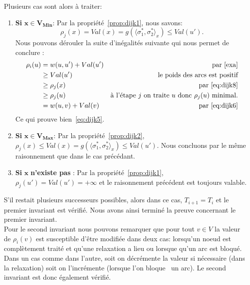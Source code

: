 \begin{enumerate}
Plusieurs cas sont alors à traiter:

\begin{enumerate}
	\item \textbf{Si }$\mathbf{x \in V_{Min}}$: Par la propriété~\ref{prop:dijk1}, nous savons:
	 \begin{equation}
		\label{eq:dijk8}\rho_j(x) = Val(x) = g(\langle \sigma_1^*, \sigma_2^* \rangle_x) \leq Val(u') .
	\end{equation}
	Nous pouvons dérouler la suite d'inégalités suivante qui nous permet de conclure : 
	\begin{align*}
		\rho_i(u) &= w(u,u') + Val(u') & \text{par}~\eqref{exa}\\
		 		  &\geq Val(u') & \text{le poids des arcs est positif} \\
				  &\geq \rho_j(x) & \text{par}~\eqref{eq:dijk8} \\
				  &\geq \rho_j(u) &  \text{à l'étape }j \text{ on traite }u \text{ donc }\rho_j(u) \text{ minimal.}\\
				  &= w(u,v) + Val(v) & \text{par}~\eqref{eq:dijk6}						
	\end{align*}
	Ce qui prouve bien~\eqref{eq:dijk5}.
	\item \textbf{Si }$\mathbf{x \in V_{Max}}$:	 Par la propriété~\ref{prop:dijk2},\\ $\rho_j(x) \leq Val(x) = g(\langle \sigma_1^*, \sigma_2^* \rangle_x) \leq Val(u') $. Nous concluons par le même raisonnement que dans le cas précédant.
	\item \textbf{Si }$\mathbf{x }$\textbf{ n'existe pas }: Par la propriété~\ref{prop:dijk1},\\ $\rho_j(u') = Val(u') = + \infty$ et le raisonnement précédent est toujours valable.
\end{enumerate}
\end{enumerate}

S'il restait plusieurs successeurs possibles, alors dans ce cas, $T_{i+1} = T_i$ et le premier invariant est vérifié.
Nous avons ainsi terminé la preuve concernant le premier invariant.\\

Pour le second invariant nous pouvons remarquer que pour tout $v \in V$ la valeur de $\rho_i(v)$ est susceptible d'être modifiée dans deux cas:  lorsqu'un noeud est complètement traité et qu'une relaxation a lieu ou lorsque qu'un arc est bloqué. Dans un cas comme dans l'autre, soit on décrémente la valeur si nécessaire (dans la relaxation) soit on l'incrémente (lorsque l'on \og bloque \fg~un arc). Le second invariant est donc également vérifié. \\

